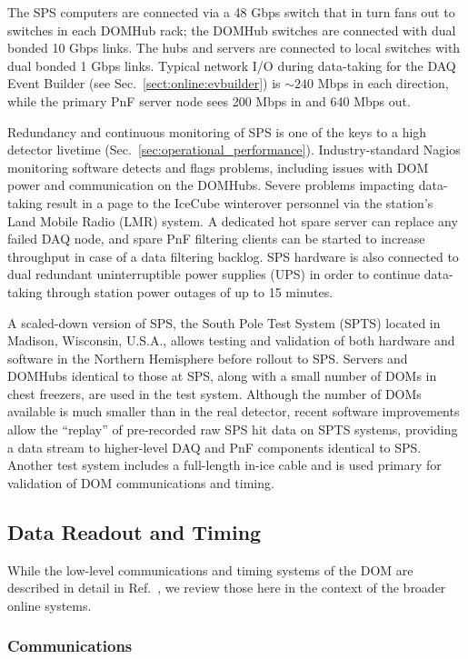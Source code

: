 The SPS computers are connected via a 48 Gbps switch that in turn fans out
to switches in each DOMHub rack; the DOMHub switches are connected with
dual bonded 10 Gbps links.  The hubs and servers are connected to local
switches with dual bonded 1 Gbps links.  Typical network I/O during
data-taking for the DAQ Event Builder (see
Sec.~\ref{sect:online:evbuilder}) is $\sim240$ Mbps in each direction, while
the primary PnF server node sees 200 Mbps in and 640 Mbps out.

Redundancy and continuous monitoring of SPS is one of the keys to a high
detector livetime (Sec.~\ref{sec:operational_performance}).
Industry-standard Nagios monitoring software detects and flags problems, 
including issues with DOM power and communication on the DOMHubs.  Severe
problems impacting data-taking result in a page to the IceCube winterover 
personnel via the station's Land Mobile Radio (LMR) system.  A dedicated
hot spare server can replace any failed DAQ node, and spare PnF filtering
clients can be started to increase throughput in case of a data filtering
backlog.  SPS hardware is also connected to dual redundant uninterruptible
power supplies (UPS) in order to continue data-taking through station power
outages of up to 15 minutes.

A scaled-down version of SPS, the South Pole Test System (SPTS) located in
Madison, Wisconsin, U.S.A., allows testing and validation of both hardware
and software in the Northern Hemisphere before rollout to SPS.  Servers and DOMHubs
identical to those at SPS, along with a small number of DOMs in chest
freezers, are used in the test system.  Although the number of DOMs
available is much smaller than in the real detector, recent software
improvements allow the ``replay'' of pre-recorded raw SPS hit data
on SPTS systems, providing a data stream to higher-level DAQ and PnF
components identical to SPS.  Another test system includes a full-length
in-ice cable and is used primary for validation of DOM communications and
timing.

\subsection{Data Readout and Timing}

While the low-level communications and timing systems of the DOM are
described in detail in Ref.~\cite{ref:domdaq}, we review those here in the
context of the broader online systems.

\subsubsection{\label{sect:online:comms}Communications}


